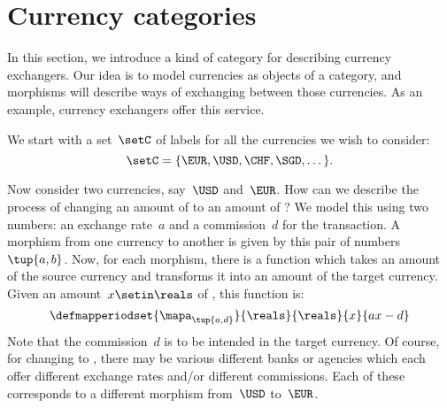 
\section{Currency categories}
\label{sec:currency_cat}
In this section, we introduce a kind of category for describing currency exchangers.
Our idea is to model currencies as objects of a category, and morphisms will describe ways of exchanging between those currencies.
As an example, currency exchangers offer this service.

We start with a set~$\setC$ of labels for all the currencies we wish to consider:
\begin{equation*}
    \setC = \{ \EUR, \USD, \CHF, \SGD, \dots \}.
\end{equation*}


Now consider two currencies, say~$\USD$ and~$\EUR$.
How can we describe the process of changing an amount of \USD to an amount of \EUR?
We model this using two numbers: an exchange rate~$a$ and a commission~$d$ for the transaction.
A morphism from one currency to another is given by this pair of numbers~$\tup{a,b}$.
Now, for each morphism, there is a function which takes an amount of the source currency and transforms it into an amount of the target currency.
Given an amount~$x \setin \reals$ of \USD, this function is:
\begin{equation*}
    \label{eq:def_curr_ex}
    \defmapperiodset{\mapa_{\tup{a,d}}}{\reals}{\reals}{x}{ax-d}
\end{equation*}
Note that the commission~$d$ is to be intended in the target currency.
Of course, for changing \USD to \EUR, there may be various different banks or agencies which each offer different exchange rates and/or different commissions.
Each of these corresponds to a different morphism from~$\USD$ to~$\EUR$.

